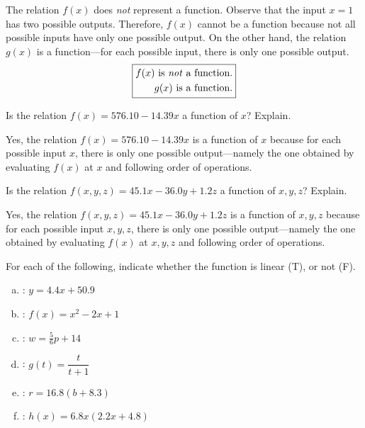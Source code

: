 \documentclass[11pt,letterpaper]{article}
\begin{document}
\sol The relation $f(x)$ does \textit{not} represent a function. Observe that the input $x= 1$ has two possible outputs. Therefore, $f(x)$ cannot be a function because not all possible inputs have only one possible output. On the other hand, the relation $g(x)$ is a function---for each possible input, there is only one possible output. 
	\[
	\boxed{%
	\begin{aligned}
	f(x) \text{ is \textit{not} a function.} \\
	g(x) \text{ is a function.}
	\end{aligned}
	}
	\]



\newpage



 Is the relation $f(x)= 576.10 - 14.39x$ a function of $x$? Explain. \pspace

\sol Yes, the relation $f(x)= 576.10 - 14.39x$ is a function of $x$ because for each possible input $x$, there is only one possible output---namely the one obtained by evaluating $f(x)$ at $x$ and following order of operations. 



\newpage



 Is the relation $f(x, y, z)= 45.1x - 36.0y + 1.2z$ a function of $x, y, z$? Explain. \pspace

\sol Yes, the relation $f(x, y, z)= 45.1x - 36.0y + 1.2z$ is a function of $x, y, z$ because for each possible input $x, y, z$, there is only one possible output---namely the one obtained by evaluating $f(x)$ at $x, y, z$ and following order of operations. 



\newpage



 For each of the following, indicate whether the function is linear (T), or not (F). 
	\begin{enumerate}[(a)]
	\item {}: $y= 4.4x + 50.9$
	\item {}: $f(x)= x^2 - 2x + 1$
	\item {}: $w= \frac{5}{6}p + 14$
	\item {}: $g(t)= \dfrac{t}{t + 1}$
	\item {}: $r= 16.8(b + 8.3)$
	\item {}: $h(x)= 6.8x(2.2x + 4.8)$
	\end{enumerate} \pspace
\end{document}
